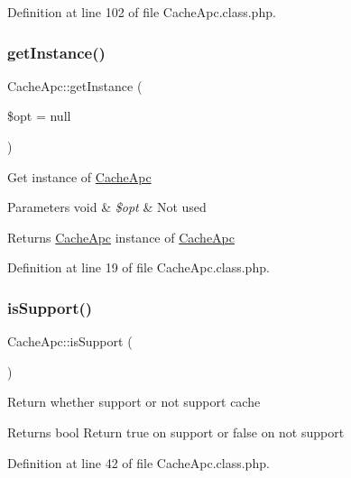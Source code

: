 Definition at line 102 of file Cache\+Apc.\+class.\+php.

\hypertarget{classCacheApc_ab175f6bbdebb9ce327c019c3be313331}{}\label{classCacheApc_ab175f6bbdebb9ce327c019c3be313331} 
\subsubsection{\texorpdfstring{get\+Instance()}{getInstance()}}
{\footnotesize\ttfamily Cache\+Apc\+::get\+Instance (\begin{DoxyParamCaption}\item[{}]{\$opt = {\ttfamily null} }\end{DoxyParamCaption})}

Get instance of \hyperlink{classCacheApc}{Cache\+Apc}


\begin{DoxyParams}[1]{Parameters}
void & {\em \$opt} & Not used \\
\hline
\end{DoxyParams}
\begin{DoxyReturn}{Returns}
\hyperlink{classCacheApc}{Cache\+Apc} instance of \hyperlink{classCacheApc}{Cache\+Apc} 
\end{DoxyReturn}


Definition at line 19 of file Cache\+Apc.\+class.\+php.

\hypertarget{classCacheApc_abd38db973d6d7188606a726d7a5fcc40}{}\label{classCacheApc_abd38db973d6d7188606a726d7a5fcc40} 
\subsubsection{\texorpdfstring{is\+Support()}{isSupport()}}
{\footnotesize\ttfamily Cache\+Apc\+::is\+Support (\begin{DoxyParamCaption}{ }\end{DoxyParamCaption})}

Return whether support or not support cache

\begin{DoxyReturn}{Returns}
bool Return true on support or false on not support 
\end{DoxyReturn}


Definition at line 42 of file Cache\+Apc.\+class.\+php.

